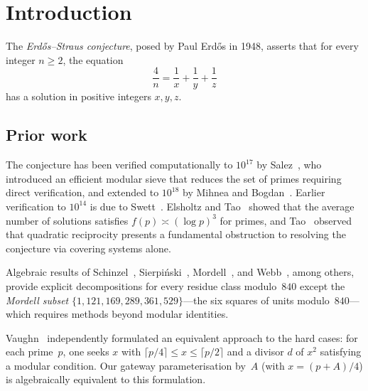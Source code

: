 \documentclass[12pt]{amsart}
\theoremstyle{definition}
\theoremstyle{remark}
\begin{document}
\maketitle

\section{Introduction}\label{sec:intro}

The \emph{Erd\H{o}s--Straus conjecture}, posed by Paul Erd\H{o}s in 1948,
asserts that for every integer $n \geq 2$, the equation
\begin{equation}\label{eq:es}
  \frac{4}{n} = \frac{1}{x} + \frac{1}{y} + \frac{1}{z}
\end{equation}
has a solution in positive integers $x, y, z$.

\subsection*{Prior work}
The conjecture has been verified computationally to $10^{17}$ by
Salez~\cite{Salez2014}, who introduced an efficient modular sieve
that reduces the set of primes requiring direct verification, and
extended to $10^{18}$ by Mihnea and Bogdan~\cite{MihneaBogdan2025}.
Earlier verification to $10^{14}$ is due to Swett~\cite{Swett1999}.
Elsholtz and Tao~\cite{ElsholtzTao2013} showed that the average
number of solutions satisfies $f(p) \asymp (\log p)^3$ for primes,
and Tao~\cite{Tao2011} observed that quadratic reciprocity presents
a fundamental obstruction to resolving the conjecture via covering
systems alone.

Algebraic results of Schinzel~\cite{Schinzel1956},
Sierpi\'nski~\cite{Sierpinski1956}, Mordell~\cite{Mordell1967},
and Webb~\cite{Webb1970}, among others, provide explicit
decompositions for every residue class modulo~$840$ except the
\emph{Mordell subset} $\{1, 121, 169, 289, 361, 529\}$---the six
squares of units modulo~$840$---which requires methods beyond
modular identities.

Vaughn~\cite{Vaughn2024} independently formulated an equivalent
approach to the hard cases: for each prime~$p$, one seeks $x$ with
$\lceil p/4\rceil \leq x \leq \lceil p/2 \rceil$ and a divisor $d$ of
$x^2$ satisfying a modular condition. Our gateway parameterisation by~$A$
(with $x = (p+A)/4$) is algebraically equivalent to this formulation.
\end{document}
